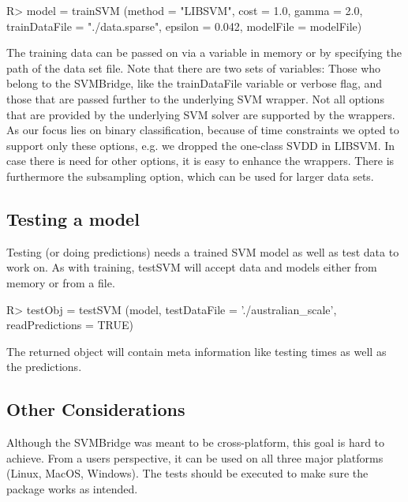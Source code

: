 \documentclass[article, shortnames]{jss}
\begin{document}
\begin{CodeChunk}
\begin{CodeInput}
R> model = trainSVM (method = "LIBSVM", cost = 1.0, gamma = 2.0,
	trainDataFile = "./data.sparse", epsilon = 0.042, modelFile = modelFile)
\end{CodeInput}
\end{CodeChunk}

The training data can be passed on via a variable in memory or by specifying the path 
of the data set file. 
Note that there are two sets of variables: Those who belong to the SVMBridge,
like the trainDataFile variable or verbose flag, and those that are passed further
to the underlying SVM wrapper.
Not all options that are provided by the underlying SVM solver
are supported by the wrappers. As our focus lies on binary classification, because of time constraints 
we opted  to support only these options, e.g. we dropped the one-class SVDD in LIBSVM.
In case there is need for other options, it is 
easy to enhance the wrappers.
There is furthermore the subsampling option, which can be used for larger data sets.


\subsection{Testing a model}

Testing (or doing predictions) needs a trained SVM model as well as test data to work on.
As with training, testSVM will accept data and models either from memory or from a file.

\begin{CodeChunk}
\begin{CodeInput}
R> testObj = testSVM (model, testDataFile = './australian_scale', 
	readPredictions = TRUE)
\end{CodeInput}
\end{CodeChunk}

The returned object will contain meta information like testing times as well as the predictions.


\subsection{Other Considerations}

Although the SVMBridge was meant to be cross-platform, this goal
is hard to achieve. From a users perspective, it can be used on all three
major platforms (Linux, MacOS, Windows). The tests should
be executed to make sure the package works as intended.
\end{document}
